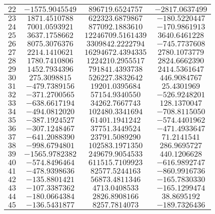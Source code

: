 \begin{center}
\begin{longtable}{|c|c|c|c|}
		$22$ & $-1575.9045549$ & $896719.6524757$ & $-2817.0637499$ \\ \hline
		$23$ & $1871.4510788$ & $622323.6879867$ & $-180.5220447$ \\ \hline
		$24$ & $7001.0593921$ & $877092.1883610$ & $-170.9861913$ \\ \hline
		$25$ & $3637.1758662$ & $12246709.5161439$ & $3640.6461228$ \\ \hline
		$26$ & $8075.3076376$ & $3309842.2222794$ & $-745.7737608$ \\ \hline
		$27$ & $2214.1410621$ & $16294672.4394335$ & $2780.1073779$ \\ \hline
		$28$ & $1780.7410806$ & $1224210.2955517$ & $2824.6662390$ \\ \hline
		$29$ & $1452.7934396$ & $791841.4393738$ & $2414.5361647$ \\ \hline
		$30$ & $275.3098815$ & $526227.3832642$ & $446.9084767$ \\ \hline
		$31$ & $-479.7389156$ & $19201.0395684$ & $25.4301969$ \\ \hline
		$32$ & $-371.2700565$ & $57154.9340550$ & $-526.9248201$ \\ \hline
		$33$ & $-638.6617194$ & $34262.7667743$ & $128.1370047$ \\ \hline
		$34$ & $-494.0812020$ & $102480.3341694$ & $-708.8115050$ \\ \hline
		$35$ & $-387.1924527$ & $61401.1941242$ & $-574.4401962$ \\ \hline
		$36$ & $-307.1248467$ & $37751.3449524$ & $-471.4933647$ \\ \hline
		$37$ & $-641.2088390$ & $23791.5089290$ & $71.2141541$ \\ \hline
		$38$ & $-998.6794801$ & $102583.1971350$ & $286.9695727$ \\ \hline
		$39$ & $-1565.9782382$ & $249679.9054533$ & $440.1206628$ \\ \hline
		$40$ & $-574.8496464$ & $611515.7109923$ & $-616.9892747$ \\ \hline
		$41$ & $-478.9398636$ & $82577.5244163$ & $-860.9916736$ \\ \hline
		$42$ & $-135.8801421$ & $56873.4811346$ & $-165.7830330$ \\ \hline
		$43$ & $-107.3387362$ & $4713.0408533$ & $-165.1299474$ \\ \hline
		$44$ & $-180.0664384$ & $2826.8908166$ & $38.8695192$ \\ \hline
		$45$ & $-136.5431877$ & $8257.7814073$ & $-189.7326436$ \\ \hline

\end{longtable}
\end{center}
